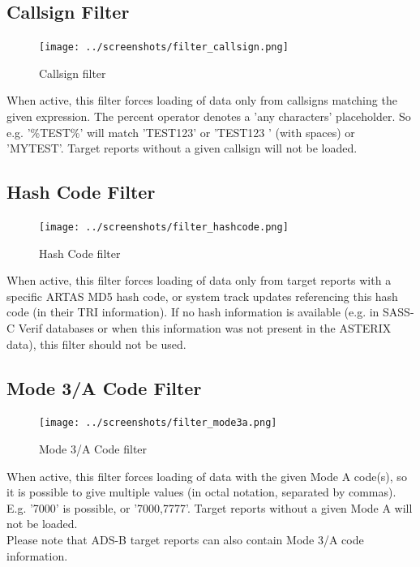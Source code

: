 \subsection{Callsign Filter}

\begin{figure}[H]
  \center
    \texttt{[image: ../screenshots/filter\_callsign.png]}
  \caption{Callsign filter}
\end{figure}

When active, this filter forces loading of data only from callsigns matching the given expression. The percent operator denotes a 'any characters' placeholder. So e.g. '\%TEST\%' will match 'TEST123' or 'TEST123   ' (with spaces) or 'MYTEST'. Target reports without a given callsign will not be loaded.

\subsection{Hash Code Filter}

\begin{figure}[H]
  \center
    \texttt{[image: ../screenshots/filter\_hashcode.png]}
  \caption{Hash Code filter}
\end{figure}

When active, this filter forces loading of data only from target reports with a specific ARTAS MD5 hash code, or system track updates referencing this hash code (in their TRI information). If no hash information is available (e.g. in SASS-C Verif databases or when this information was not present in the ASTERIX data), this filter should not be used.

\subsection{Mode 3/A Code Filter}

\begin{figure}[H]
  \center
    \texttt{[image: ../screenshots/filter\_mode3a.png]}
  \caption{Mode 3/A Code filter}
\end{figure}

When active, this filter forces loading of data with the given Mode A code(s), so it is possible to give multiple values (in octal notation, separated by commas). E.g. '7000' is possible, or '7000,7777'. Target reports without a given Mode A will not be loaded. \\

Please note that ADS-B target reports can also contain Mode 3/A code information.

